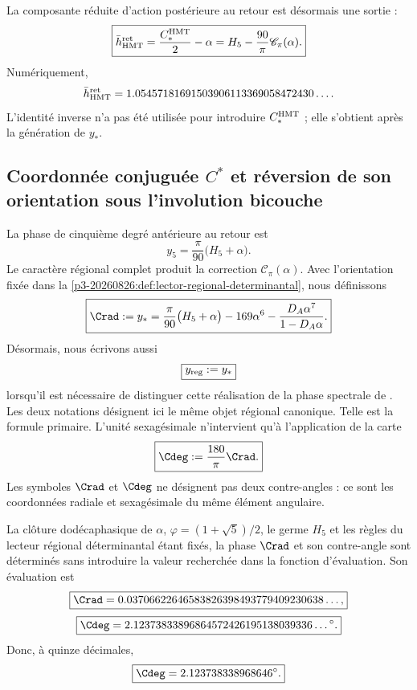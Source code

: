 La composante réduite d'action postérieure au retour est désormais une
sortie :
\[
\boxed{
\bar h_{\rm HMT}^{\rm ret}
=\frac{C_*^{\rm HMT}}2-\alpha
=H_5-\frac{90}{\pi}\mathscr C_\pi(\alpha).}
\]
Numériquement,
\[
\bar h_{\rm HMT}^{\rm ret}
=1.05457181691503906113369058472430\ldots.
\]
L'identité inverse n'a pas été utilisée pour introduire \(C_*^{\rm HMT}\) ; elle
s'obtient après la génération de \(y_*\).

\subsection{Coordonnée conjuguée \texorpdfstring{\(C^*\)}{C*} et réversion de son orientation sous l'involution bicouche}
\label{sec:s102:c38:4:2}


La phase de cinquième degré antérieure au retour est
\[
y_5=\frac\pi{90}\bigl(H_5+\alpha\bigr).
\]
Le caractère régional complet produit la correction
\(\mathscr C_\pi(\alpha)\). Avec l'orientation fixée dans la
\cref{p3-20260826:def:lector-regional-determinantal}, nous définissons
\[
\boxed{
\Crad:=y_*=\frac\pi{90}\bigl(H_5+\alpha\bigr)
-169\alpha^6
-\frac{D_A\alpha^7}{1-D_A\alpha}.}
\]
Désormais, nous écrivons aussi
\[
 \boxed{y_{\rm reg}:=y_*}
\]
lorsqu'il est nécessaire de distinguer cette réalisation de la phase spectrale de
\Gtr. Les deux notations désignent ici le même objet régional canonique.
Telle est la formule primaire. L'unité sexagésimale n'intervient qu'à l'application de la carte
\[
\boxed{\Cdeg:=\frac{180}{\pi}\Crad.}
\]
Les symboles \(\Crad\) et \(\Cdeg\) ne désignent pas deux contre-angles : ce sont les
coordonnées radiale et sexagésimale du même élément angulaire.

\begin{theorem}
\label{p3-20260826:thm:contraangulo-regional}
La clôture dodécaphasique de \(\alpha\),
\(\varphi=(1+\sqrt5)/2\), le germe \(H_5\) et les règles du lecteur régional
déterminantal étant fixés, la phase \(\Crad\) et son contre-angle sont déterminés sans
introduire la valeur recherchée dans la fonction d'évaluation. Son évaluation est
\[
\boxed{
\Crad=0.03706622646583826398493779409230638\ldots,}
\]
\[
\boxed{
\Cdeg
=2.12373833896864572426195138039336\ldots{}^\circ.}
\]
Donc, à quinze décimales,
\[
\boxed{\Cdeg=2.123738338968646^\circ.}
\]
\end{theorem}

